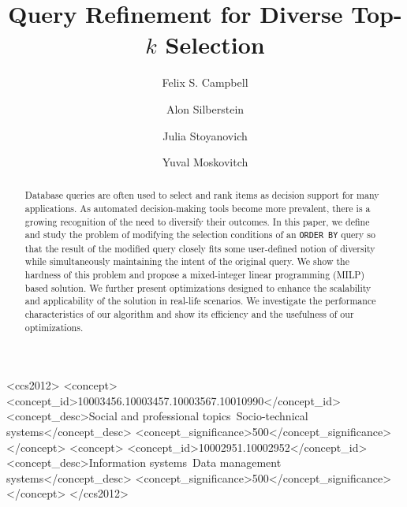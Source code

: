 \documentclass[acmsmall]{acmart}
\begin{document}
\title{Query Refinement for Diverse Top-$k$ Selection}

\author{Felix S. Campbell}

\author{Alon Silberstein}

\author{Julia Stoyanovich}

\author{Yuval Moskovitch}

\renewcommand{\shortauthors}{Felix S. Campbell, Alon Silberstein, Julia Stoyanovich, \& Yuval Moskovitch}

\begin{abstract}
Database queries are often used to select and rank items as decision support for many applications. As automated decision-making tools become more prevalent, there is a growing recognition of the need to diversify their outcomes. In this paper, we define and study the problem of modifying the selection conditions of an {\tt ORDER BY} query so that the result of the modified query 
closely fits some user-defined notion of diversity while simultaneously maintaining the intent of the original query. We show the hardness of this problem and propose a mixed-integer linear programming (MILP) based solution. We further present optimizations designed to enhance the scalability and applicability of the solution in real-life scenarios. 
We investigate the performance characteristics of our algorithm and show its efficiency and the usefulness of our optimizations.

\end{abstract}

\begin{CCSXML}
<ccs2012>
<concept>
<concept_id>10003456.10003457.10003567.10010990</concept_id>
<concept_desc>Social and professional topics~Socio-technical systems</concept_desc>
<concept_significance>500</concept_significance>
</concept>
   <concept>
       <concept_id>10002951.10002952</concept_id>
       <concept_desc>Information systems~Data management systems</concept_desc>
       <concept_significance>500</concept_significance>
       </concept>
</ccs2012>
\end{CCSXML}
\end{document}
